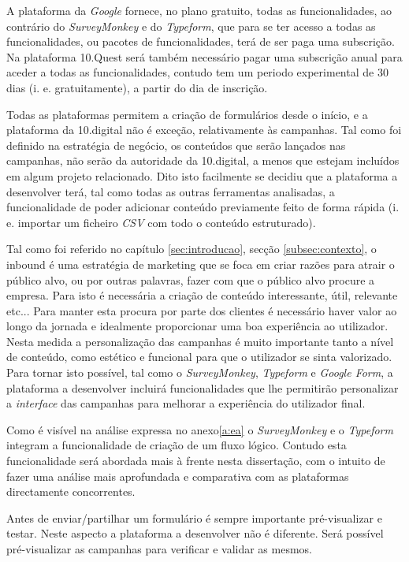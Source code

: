 A plataforma da \textit{Google} fornece, no plano gratuito, todas as funcionalidades, ao contrário do \textit{SurveyMonkey} e do \textit{Typeform}, que para se ter acesso a todas as funcionalidades, ou pacotes de funcionalidades, terá de ser paga uma subscrição. Na plataforma 10.Quest será também necessário pagar uma subscrição anual para aceder a todas as funcionalidades, contudo tem um periodo experimental de 30 dias (i. e. gratuitamente), a partir do dia de inscrição.

Todas as plataformas permitem a criação de formulários desde o início, e a plataforma da 10.digital não é exceção, relativamente às campanhas. Tal como foi definido na estratégia de negócio, os conteúdos que serão lançados nas campanhas, não serão da autoridade da 10.digital, a menos que estejam incluídos em algum projeto relacionado. Dito isto facilmente se decidiu que a plataforma a desenvolver terá, tal como todas as outras ferramentas analisadas, a funcionalidade de poder adicionar conteúdo previamente feito de forma rápida (i. e. importar um ficheiro \textit{CSV} com todo o conteúdo estruturado). 


Tal como foi referido no capítulo \ref{sec:introducao}, secção \ref{subsec:contexto}, o inbound é uma estratégia de marketing que se foca em criar razões para atrair o público alvo, ou por outras palavras, fazer com que o público alvo procure a empresa. Para isto é necessária a criação de conteúdo interessante, útil, relevante etc... Para manter esta procura por parte dos clientes é necessário haver valor ao longo da jornada e idealmente proporcionar uma boa experiência ao utilizador. Nesta medida a personalização das campanhas é muito importante tanto a nível de conteúdo, como estético e funcional para que o utilizador se sinta valorizado. Para tornar isto possível, tal como o \textit{SurveyMonkey}, \textit{Typeform} e \textit{Google Form}, a plataforma a desenvolver incluirá funcionalidades que lhe permitirão personalizar a \textit{interface} das campanhas para melhorar a experiência do utilizador final. 

Como é visível na análise expressa no anexo\ref{a:ea} o \textit{SurveyMonkey} e o \textit{Typeform} integram a funcionalidade de criação de um fluxo lógico. Contudo esta funcionalidade será abordada mais à frente nesta dissertação, com o intuito de fazer uma análise  mais aprofundada e comparativa com as plataformas directamente concorrentes.

Antes de enviar/partilhar um formulário é sempre importante pré-visualizar e testar. Neste aspecto a plataforma a desenvolver não é diferente. Será possível pré-visualizar as campanhas para verificar e validar as mesmos. 

